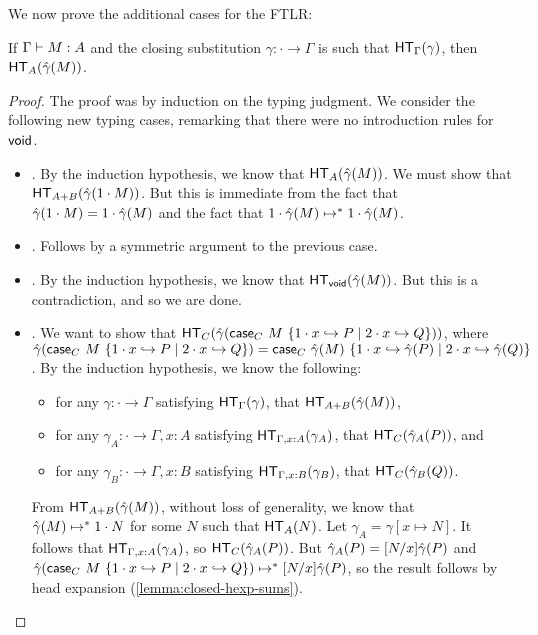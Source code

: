 \documentclass{article}
\begin{document}
We now prove the additional cases for the FTLR:

\begin{theorem}
  \label{thm:closed-ftlr-sums}
  If $\Gamma \vdash M : A$ and the closing substitution $\gamma : \cdot \to \Gamma$ is such that $\mathsf{HT}_{\Gamma}(\gamma)$, then $\mathsf{HT}_{A}(\hat \gamma(M))$.
\end{theorem}

\begin{proof}
  The proof was by induction on the typing judgment.
  We consider the following new typing cases, remarking that there were no introduction rules for $\mathsf{void}$.
  \begin{itemize}
  \item {}. By the induction hypothesis, we know that $\mathsf{HT}_{A}(\hat \gamma(M))$.
    We must show that $\mathsf{HT}_{A + B}(\hat \gamma(1\cdot M))$.
    But this is immediate from the fact that $\hat \gamma(1\cdot M) = 1\cdot\hat \gamma(M)$ and the fact that $1\cdot\hat \gamma(M) \mapsto^* 1\cdot\hat \gamma(M)$.
  \item {}. Follows by a symmetric argument to the previous case.
  \item {}. By the induction hypothesis, we know that $\mathsf{HT}_{\mathsf{void}}(\hat \gamma(M))$.
    But this is a contradiction, and so we are done.
  \item {}. We want to show that $\mathsf{HT}_{C}(\hat\gamma(\mathsf{case}_{C}\ M\ \{1\cdot x \hookrightarrow P \mid 2\cdot x \hookrightarrow Q\}))$, where $\hat\gamma(\mathsf{case}_{C}\ M\ \{1\cdot x \hookrightarrow P \mid 2\cdot x \hookrightarrow Q\}) = \mathsf{case}_{C}\ \hat\gamma(M)\ \{1\cdot x \hookrightarrow \hat\gamma(P) \mid 2\cdot x \hookrightarrow \hat\gamma(Q)\}$.
    By the induction hypothesis, we know the following:
    \begin{itemize}
    \item for any $\gamma : \cdot \to \Gamma$ satisfying $\mathsf{HT}_{\Gamma}(\gamma)$, that $\mathsf{HT}_{A+B}(\hat\gamma(M))$,
    \item for any $\gamma_A : \cdot \to \Gamma, x:A$ satisfying $\mathsf{HT}_{\Gamma, x:A}(\gamma_A)$, that $\mathsf{HT}_{C}(\hat\gamma_A(P))$, and
    \item for any $\gamma_B : \cdot \to \Gamma, x:B$ satisfying $\mathsf{HT}_{\Gamma, x:B}(\gamma_B)$, that $\mathsf{HT}_{C}(\hat\gamma_B(Q))$.
    \end{itemize}

    From $\mathsf{HT}_{A+B}(\hat\gamma(M))$, without loss of generality, we know that $\hat\gamma(M) \mapsto^* 1\cdot N$ for some $N$ such that $\mathsf{HT}_{A}(N)$.
    Let $\gamma_A = \gamma[x \mapsto N]$.
    It follows that $\mathsf{HT}_{\Gamma,x:A}(\gamma_A)$, so $\mathsf{HT}_{C}(\hat\gamma_A(P))$.
    But $\hat\gamma_A(P) = [N/x]\hat\gamma(P)$ and $\hat\gamma(\mathsf{case}_{C}\ M\ \{1\cdot x \hookrightarrow P \mid 2\cdot x \hookrightarrow Q\}) \mapsto^* [N/x]\hat\gamma(P)$, so the result follows by head expansion (\cref{lemma:closed-hexp-sums}).\qedhere
  \end{itemize}
\end{proof}
\end{document}
